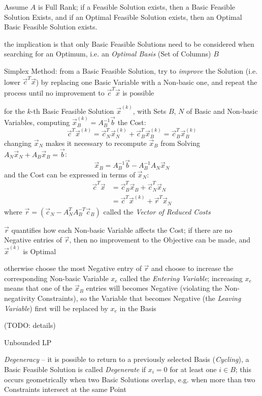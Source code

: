 Assume $A$ is Full Rank; if a Feasible Solution exists, then a Basic Feasible
Solution Exists, and if an Optimal Feasible Solution exists, then an Optimal
Basic Feasible Solution exists.

the implication is that only Basic Feasible Solutions need to be considered
when searching for an Optimum, i.e. an \emph{Optimal Basis} (Set of Columns)
$B$

Simplex Method: from a Basic Feasible Solution, try to \emph{improve} the
Solution (i.e. lower $\vec{c}^T\vec{x}$) by replacing one Basic Variable with a
Non-basic one, and repeat the process until no improvement to
$\vec{c}^T\vec{x}$ is possible

for the $k$-th Basic Feasible Solution $\vec{x}^{(k)}$, with Sets $B$, $N$ of
Basic and Non-basic Variables, computing $\vec{x}_B^{(k)} = A_B^{-1}\vec{b}$
the Cost:
\[
  \vec{c}^T\vec{x}^{(k)} =
  \vec{c}_N^T\vec{x}_N^{(k)} + \vec{c}_B^T\vec{x}_B^{(k)} =
  \vec{c}_B^T\vec{x}_B^{(k)}
\]
changing $\vec{x}_N$ makes it necessary to recompute $\vec{x}_B$ from Solving
$A_N\vec{x}_N + A_B\vec{x}_B = \vec{b}$:
\[
  \vec{x}_B = A_B^{-1}\vec{b} - A_B^{-1}A_N\vec{x}_N
\]
and the Cost can be expressed in terms of $\vec{x}_N$:
\begin{align*}
  \vec{c}^T\vec{x} & = \vec{c}_B^T\vec{x}_B + \vec{c}_N^T\vec{x}_N \\
                   & = \vec{c}^T\vec{x}^{(k)} + \vec{r}^T\vec{x}_N
\end{align*}
where $\vec{r} = (\vec{c}_N - A_N^T A_B^{-T} \vec{c}_B)$ called the \emph{Vector
  of Reduced Costs}

$\vec{r}$ quantifies how each Non-basic Variable affects the Cost; if there are
no Negative entries of $\vec{r}$, then no improvement to the Objective can be
made, and $\vec{x}^{(k)}$ is Optimal

otherwise choose the most Negative entry of $\vec{r}$ and choose to increase
the corresponding Non-basic Variable $x_e$ called the \emph{Entering Variable};
increasing $x_e$ means that one of the $\vec{x}_B$ entries will becomes
Negative (violating the Non-negativity Constraints), so the Variable that
becomes Negative (the \emph{Leaving Variable}) first will be replaced by $x_e$
in the Basis

(TODO: details)

Unbounded LP

\emph{Degeneracy} -- it is possible to return to a previously selected Basis
(\emph{Cycling}), a Basic Feasible Solution is called \emph{Degenerate} if $x_i
= 0$ for at least one $i \in B$; this occurs geometrically when two Basic
Solutions overlap, e.g. when more than two Constraints intersect at the same
Point

